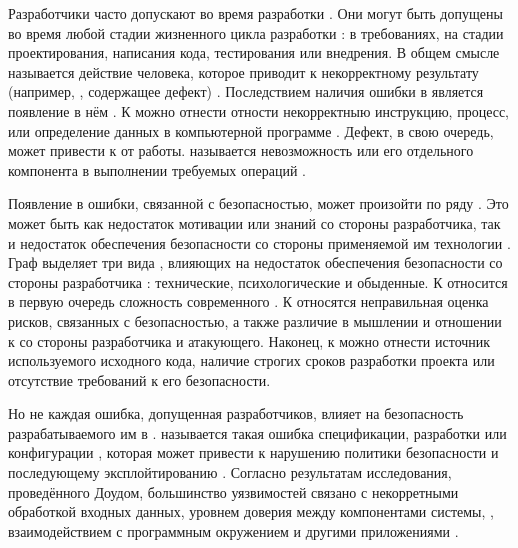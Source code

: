 %
Разработчики часто допускают  во время разработки . 
%
Они могут быть допущены во время любой стадии жизненного цикла разработки : в требованиях, на стадии проектирования, написания кода, тестирования или внедрения. 
%
В общем смысле  называется действие человека, которое приводит к некорректному результату (например, , содержащее дефект) . 
%
Последствием наличия ошибки в  является появление в нём . 
%
К  можно отнести отности некорректныю инструкцию, процесс, или определение данных в компьютерной программе . 
%
Дефект, в свою очередь, может привести к   от работы. 
%
 называется невозможность  или его отдельного компонента в выполнении требуемых операций .

%
Появление в  ошибки, связанной с безопасностью, может произойти по ряду . 
%
Это может быть как недостаток мотивации или знаний со стороны разработчика, так и недостаток обеспечения безопасности со стороны применяемой им технологии . 
%
Граф выделяет три вида , влияющих на недостаток обеспечения безопасности со стороны разработчика : технические, психологические и обыденные. 
%
К  относится в первую очередь сложность современного . 
%
К  относятся неправильная оценка рисков, связанных с безопасностью, а также различие в мышлении и отношении к  со стороны разработчика и атакующего. 
%
Наконец, к  можно отнести источник используемого исходного кода, наличие строгих сроков разработки проекта или отсутствие требований к его безопасности.

%
Но не каждая ошибка, допущенная разработчиков, влияет на безопасность разрабатываемого им в . 
%
 называется такая ошибка спецификации, разработки или конфигурации , которая может привести к нарушению политики безопасности и последующему эксплойтированию     .
%
Согласно результатам исследования, проведённого Доудом, большинство уязвимостей связано с некорретными обработкой входных данных, уровнем доверия между компонентами системы, , взаимодействием с программным окружением и другими приложениями . 


